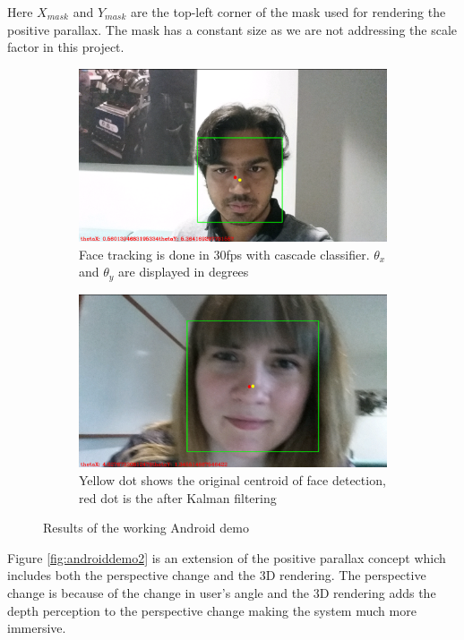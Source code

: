 \documentclass[12pt,twocolumn,letterpaper]{article}
\begin{document}
Here $X_{mask}$ and $Y_{mask}$ are the top-left corner of the mask used for rendering the positive parallax. The mask has a constant size as we are not addressing the scale factor in this project.
\begin{figure}[!htbp]
\centering
\begin{subfigure}{0.5\textwidth}
\includegraphics[scale=0.09]{images/jai}
\caption{Face tracking is done in 30fps with cascade classifier. $\theta_x$ and $\theta_y$ are displayed in degrees}
\end{subfigure}
\begin{subfigure}{0.5\textwidth}
\includegraphics[scale=0.09]{images/jenna2}
\caption{Yellow dot shows the original centroid of face detection, red dot is the after Kalman filtering}
\end{subfigure}
\caption{Results of the working Android demo}
\label{fig:androiddemo}
\end{figure}

Figure \ref{fig:androiddemo2} is an extension of the positive parallax concept which includes both the perspective change and the 3D rendering. The perspective change is because of the change in user's angle and the 3D rendering adds the depth perception to the perspective change making the system much more immersive. 
\end{document}
